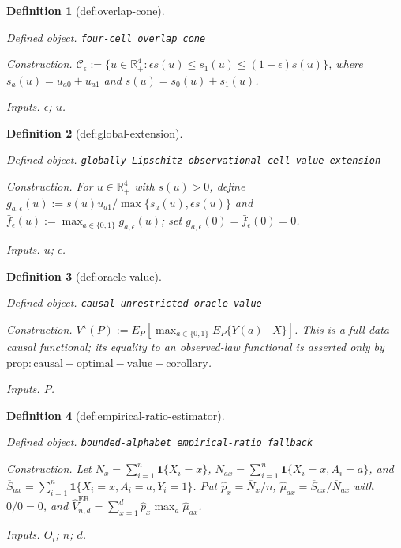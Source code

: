 \documentclass{article}
\newtheorem{definition}{Definition}
\begin{document}
\begin{definition}[def:overlap-cone]\label{def:overlap-cone}
\par\smallskip\noindent\emph{Defined object.} \texttt{four-\allowbreak{}cell overlap cone}
\par\smallskip\noindent\emph{Construction.} \(\mathcal C_\epsilon:=\{u\in\mathbb R_+^4:\epsilon s(u)\leq s_1(u)\leq(1-\epsilon)s(u)\}\), where \(s_a(u)=u_{a0}+u_{a1}\) and \(s(u)=s_0(u)+s_1(u)\).
\par\smallskip\noindent\emph{Inputs.} \(\epsilon\); \(u\).
\end{definition}

\begin{definition}[def:global-extension]\label{def:global-extension}
\par\smallskip\noindent\emph{Defined object.} \texttt{globally Lipschitz observational cell-\allowbreak{}value extension}
\par\smallskip\noindent\emph{Construction.} For \(u\in\mathbb R_+^4\) with \(s(u)>0\), define \(g_{a,\epsilon}(u):=s(u)u_{a1}/\max\{s_a(u),\epsilon s(u)\}\) and \(\bar f_\epsilon(u):=\max_{a\in\{0,1\}}g_{a,\epsilon}(u)\); set \(g_{a,\epsilon}(0)=\bar f_\epsilon(0)=0\).
\par\smallskip\noindent\emph{Inputs.} \(u\); \(\epsilon\).
\end{definition}

\begin{definition}[def:oracle-value]\label{def:oracle-value}
\par\smallskip\noindent\emph{Defined object.} \texttt{causal unrestricted oracle value}
\par\smallskip\noindent\emph{Construction.} \(V^\star(P):=E_P[\max_{a\in\{0,1\}}E_P\{Y(a)\mid X\}]\).  This is a full-data causal functional; its equality to an observed-law functional is asserted only by \(\mathrm{prop:causal-optimal-value-corollary}\).
\par\smallskip\noindent\emph{Inputs.} \(P\).
\end{definition}

\begin{definition}[def:empirical-ratio-estimator]\label{def:empirical-ratio-estimator}
\par\smallskip\noindent\emph{Defined object.} \texttt{bounded-\allowbreak{}alphabet empirical-\allowbreak{}ratio fallback}
\par\smallskip\noindent\emph{Construction.} Let \(\overline N_x=\sum_{i=1}^n\mathbf 1\{X_i=x\}\), \(\overline N_{ax}=\sum_{i=1}^n\mathbf 1\{X_i=x,A_i=a\}\), and \(\overline S_{ax}=\sum_{i=1}^n\mathbf 1\{X_i=x,A_i=a,Y_i=1\}\). Put \(\widehat p_x=\overline N_x/n\), \(\widehat\mu_{ax}=\overline S_{ax}/\overline N_{ax}\) with \(0/0=0\), and \(\widehat V_{n,d}^{\mathrm{ER}}=\sum_{x=1}^d\widehat p_x\max_a\widehat\mu_{ax}\).
\par\smallskip\noindent\emph{Inputs.} \(O_i\); \(n\); \(d\).
\end{definition}
\end{document}
